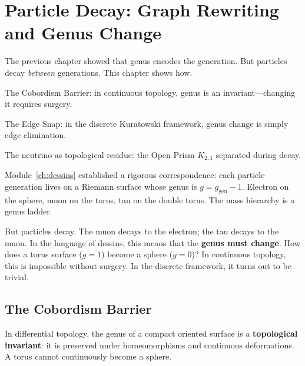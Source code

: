 \chapter{Particle Decay: Graph Rewriting and Genus Change}
\label{ch:decay}

\begin{introduction}
  \item The previous chapter showed that genus encodes the
        generation. But particles decay \emph{between}
        generations. This chapter shows how.
  \item The Cobordism Barrier: in continuous topology, genus
        is an invariant---changing it requires surgery.
  \item The Edge Snap: in the discrete Kuratowski framework,
        genus change is simply edge elimination.
  \item The neutrino as topological residue: the Open Prism $K_{2,1}$
        separated during decay.
\end{introduction}

Module~\ref{ch:dessins} established a rigorous correspondence:
each particle generation lives on a Riemann surface whose
genus is $g = g_{\mathrm{gen}} - 1$. Electron on the sphere, muon on
the torus, tau on the double torus. The mass hierarchy is a genus
ladder.

But particles decay. The muon decays to the electron; the tau
decays to the muon. In the language of dessins, this means that the
\textbf{genus must change}. How does a torus surface
($g = 1$) become a sphere ($g = 0$)? In continuous topology, this is
impossible without surgery. In the discrete framework, it turns out to be trivial.

\section{The Cobordism Barrier}
\label{sec:barrera-cobordismo}

In differential topology, the genus of a compact oriented surface
is a \textbf{topological invariant}: it is preserved under homeomorphisms and
continuous deformations. A torus cannot continuously become
a sphere.

